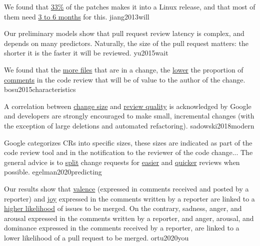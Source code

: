 \documentclass{article}
\begin{document}

  {We found that \ul{33\%} of the patches makes it into a Linux release, and that most of them need \ul{3 to 6 months} for this.}
  {jiang2013will}


  {Our preliminary models show that pull request review latency is complex, and depends on many predictors. Naturally, the size of the pull request matters: the shorter it is the faster it will be reviewed.}
  {yu2015wait}

  {We found that the \ul{more files} that are in a change, the \ul{lower} the proportion of \ul{comments} in the code review that will be of value to the author of the change.}
  {bosu2015characteristics}

  {A correlation between \ul{change size} and \ul{review quality} is acknowledged by Google and developers are strongly encouraged to make small, incremental changes (with the exception of large deletions and automated refactoring).}
  {sadowski2018modern}


  {Google categorizes CRs into specific sizes, these sizes are indicated as part of the code review tool and in the notification to the reviewer of the code change... The general advice is to \ul{split} change requests for \ul{easier} and \ul{quicker} reviews when possible.}
  {egelman2020predicting}


  {Our results show that \ul{valence} (expressed in comments received and posted by a reporter) and \ul{joy} expressed in the comments written by a reporter are linked to a \ul{higher likelihood} of issues to be merged. On the contrary, sadness, anger, and arousal expressed in the comments written by a reporter, and anger, arousal, and dominance expressed in the comments received by a reporter, are linked to a lower likelihood of a pull request to be merged.}
  {ortu2020you}

\end{document}
